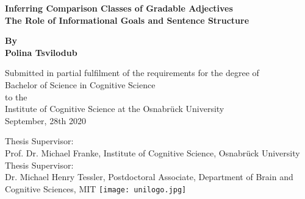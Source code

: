 \begin{titlepage}
	\begin{center}
		\vspace*{1cm}
		\Huge
		\textbf{Inferring Comparison Classes of Gradable Adjectives\\} 
		\vspace{0.5cm}
		\Large
		\textbf{The Role of Informational Goals and Sentence Structure}
		
		\vspace{1cm}
		
	
		\textbf{By \\ Polina Tsvilodub}
		
		\vspace{1cm}
		\small
		Submitted in partial fulfilment of the requirements for the degree of \\
		Bachelor of Science in Cognitive Science \\ to the \\
		Institute of Cognitive Science at the Osnabrück University\\
		September, 28th 2020
		
		\vspace{3cm}
		Thesis Supervisor:\\ Prof. Dr. Michael Franke, Institute of Cognitive Science, Osnabrück University \\
		\vspace{0.5cm}
		Thesis Supervisor:\\ Dr. Michael Henry Tessler, Postdoctoral Associate, Department of Brain and Cognitive Sciences, MIT  
		\vfill 
		\texttt{[image: unilogo.jpg]}
		
	\end{center}
\end{titlepage}